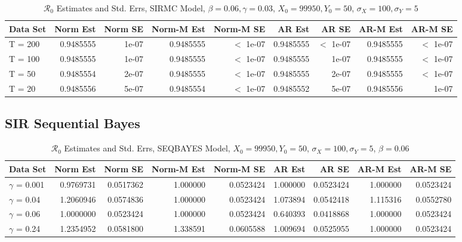 \message{ !name(draft_v13.tex)}\documentclass[12pt]{article}
\newcommand{\rr}{\ensuremath{\mathcal{R}_0}}
\begin{document}
\begin{table}[H]
	
	\caption{\label{tab:}$\rr$ Estimates and Std. Errs, SIRMC Model,
		$\beta = 0.06, \gamma = 0.03$, $X_0 = 99950, Y_0 = 50$, $\sigma_X = 100, \sigma_Y = 5$}
	\centering
	\begin{tabular}[t]{l|r|r|r|r|r|r|r|r}
		\hline
		Data Set & Norm Est & Norm SE & Norm-M Est & Norm-M SE & AR Est & AR SE & AR-M Est & AR-M SE\\
		\hline
		T = 200 & 0.9485555 & 1e-07 & 0.9485555 & $<$ 1e-07 & 0.9485555 & $<$ 1e-07 & 0.9485555 & $<$ 1e-07\\
		\hline
		T = 100 & 0.9485555 & 1e-07 & 0.9485555 & $<$ 1e-07 & 0.9485555 & 1e-07 & 0.9485555 & $<$ 1e-07\\
		\hline
		T = 50 & 0.9485554 & 2e-07 & 0.9485555 & $<$ 1e-07 & 0.9485555 & 2e-07 & 0.9485555 & $<$ 1e-07\\
		\hline
		T = 20 & 0.9485556 & 5e-07 & 0.9485554 & $<$ 1e-07 & 0.9485552 & 5e-07 & 0.9485556 & 1e-07\\
		\hline
	\end{tabular}
\end{table}

\subsection{SIR Sequential Bayes}

\begin{table}[H]
	
	\caption{\label{tab:}$\rr$ Estimates and Std. Errs, SEQBAYES Model,
		$X_0 = 99950, Y_0 = 50$, $\sigma_X = 100, \sigma_Y = 5$, $\beta = 0.06$}
	\centering
	\begin{footnotesize}
	\begin{tabular}[t]{l|r|r|r|r|r|r|r|r}
		\hline
		Data Set & Norm Est & Norm SE & Norm-M Est & Norm-M SE & AR Est & AR SE & AR-M Est & AR-M SE\\
		\hline
		$\gamma$ = 0.001 & 0.9769731 & 0.0517362 & 1.000000 & 0.0523424 & 1.000000 & 0.0523424 & 1.000000 & 0.0523424\\
		\hline
		$\gamma$ = 0.04 & 1.2060946 & 0.0574836 & 1.000000 & 0.0523424 & 1.073894 & 0.0542418 & 1.115316 & 0.0552780\\
		\hline
		$\gamma$ = 0.06 & 1.0000000 & 0.0523424 & 1.000000 & 0.0523424 & 0.640393 & 0.0418868 & 1.000000 & 0.0523424\\
		\hline
		$\gamma$ = 0.24 & 1.2354952 & 0.0581800 & 1.338591 & 0.0605588 & 1.009694 & 0.0525955 & 1.000000 & 0.0523424\\
		\hline
	\end{tabular}
\end{footnotesize}
\end{table}
\end{document}
